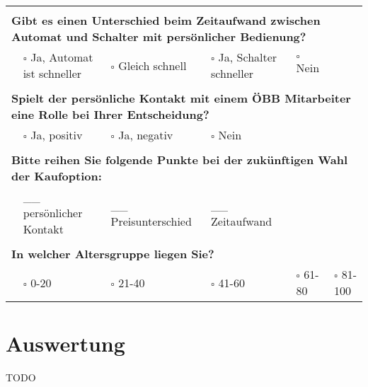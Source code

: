 \documentclass[]{article}
\begin{document}
\begin{landscape}
\begin{table}[h!]
\begin{tabular}{|llllll|}
		& & & & & \\ \hline
		& & & & & \\
		\multicolumn{6}{|l|}{\textbf{Gibt es einen Unterschied beim Zeitaufwand zwischen Automat und Schalter mit persönlicher Bedienung?}} \\ \hline
		& $\square$ Ja, Automat ist schneller & $\square$ Gleich schnell & $\square$ Ja, Schalter schneller & $\square$ Nein  &             \\ \hline
		& & & & & \\
		\multicolumn{6}{|l|}{\textbf{Spielt der persönliche Kontakt mit einem ÖBB Mitarbeiter eine Rolle bei Ihrer Entscheidung?}}          \\ \hline
		& $\square$ Ja, positiv & $\square$ Ja, negativ & $\square$ Nein &  &                                                               \\ \hline
		& & & & & \\
		\multicolumn{6}{|l|}{\textbf{Bitte reihen Sie folgende Punkte bei der zukünftigen Wahl der Kaufoption:}}                            \\ \hline
		& \_\_ persönlicher Kontakt       & \_\_ Preisunterschied          & \_\_ Zeitaufwand             &  &                              \\ \hline
		& & & & & \\
		\multicolumn{6}{|l|}{\textbf{In welcher Altersgruppe liegen Sie?}}                                                                  \\ \hline
		& $\square$ 0-20 & $\square$ 21-40 & $\square$ 41-60 & $\square$ 61-80 & $\square$ 81-100                                           \\ \hline
	\end{tabular}
\end{table}

\end{landscape}
\newpage
\restoregeometry

\section{Auswertung}
\label{sec:auswertung}

TODO



\end{document}
